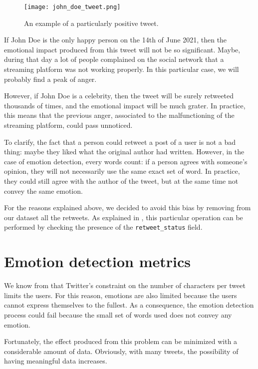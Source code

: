\begin{figure}[H]
	\centering
    	\texttt{[image: john\_doe\_tweet.png]}
    	\caption{An example of a particularly positive tweet.}
    	\label{fig:tweet-example}
\end{figure}

If John Doe is the only happy person on the 14th of June 2021, then the emotional impact produced from this tweet will not be so significant. Maybe, during that day a lot of people complained on the social network that a streaming platform was not working properly. In this particular case, we will probably find a peak of anger.

However, if John Doe is a celebrity, then the tweet will be surely retweeted thousands of times, and the emotional impact will be much grater. In practice, this means that the previous anger, associated to the malfunctioning of the streaming platform, could pass unnoticed.

To clarify, the fact that a person could retweet a post of a user is not a bad thing: maybe they liked what the original author had written. However, in the case of emotion detection, every words count: if a person agrees with someone's opinion, they will not necessarily use the same exact set of word. In practice, they could still agree with the author of the tweet, but at the same time not convey the same emotion.

For the reasons explained above, we decided to avoid this bias by removing from our dataset all the retweets. As explained in , this particular operation can be performed by checking the presence of the \texttt{retweet\_status} field. 

\section{Emotion detection metrics}
\label{sec:metrics}

We know from  that Twitter's constraint on the number of characters per tweet limits the users. For this reason, emotions are also limited because the users cannot express themselves to the fullest. As a consequence, the emotion detection process could fail because the small set of words used does not convey any emotion. 

Fortunately, the effect produced from this problem can be minimized with a considerable amount of data. Obviously, with many tweets, the possibility of having meaningful data increases.

